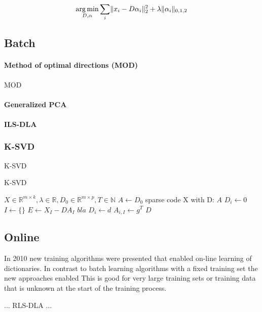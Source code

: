 \begin{align} 
\operatorname*{arg\,min}_{D,\alpha} \sum_{i}
\lVert x_i - D\alpha_i \rVert^{2}_{2}  +  \lambda \lVert \alpha_i
\rVert_{0,1,2}
\end{align}


\subsection{Batch}
\paragraph{Method of optimal directions (MOD)}
MOD\cite{Engan1999a}
\paragraph{Generalized PCA}
\cite{?}
\paragraph{ILS-DLA}
\cite{Engan2007}


\subsubsection{K-SVD}
\label{sec:k-svd}

K-SVD\cite{Aharon2006}

\begin{algorithm}[H]
\caption{K-SVD}
\begin{algorithmic}[1]
\REQUIRE $X \in \mathbb{R}^{m \times k}, \lambda \in
\mathbb{R}, D_0 \in \mathbb{R}^{m \times p}, T \in \mathbb{N}$
\STATE $A \gets D_0$
\STATE sparse code X with D: $A$
\STATE $D_i \gets 0$
\STATE $I \gets \{\}$
\STATE $E \gets X_I - DA_I$
\STATE $bla$
\STATE $D_i \gets d$
\STATE $A_{i,I} \gets g^T$
\ENDFOR 
\ENDFOR
\RETURN $D$
\end{algorithmic}
\end{algorithm}

\subsection{Online}
In 2010 new training algorithms were presented that enabled on-line learning of
dictionaries. In contrast to batch learning algorithms with a fixed training set
the new approaches enabled This is good for very large training sets or training
data that is unknown at the start of the training process.

... RLS-DLA\cite{Engan2010} ...

